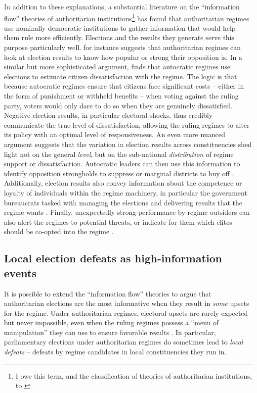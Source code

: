 \documentclass[12pt]{article}\usepackage[]{graphicx}\usepackage[]{color}
\newcommand{\1}{\mathbbm{1}}
\begin{document}
In addition to these explanations, a substantial literature on the ``information flow'' theories of authoritarian institutions\footnote{I owe this term, and the classification of theories of authoritarian institutions, to \cite{Hou2017}} has found that authoritarian regimes use nominally democratic institutions to gather information that would help them rule more efficiently. Elections and the results they generate serve this purpose particularly well. \cite{Geddes2005} for instance suggests that authoritarian regimes can look at election results to know how popular or strong their opposition is. In a similar but more sophisticated argument, \cite{Miller2015} finds that autocratic regimes use elections to estimate citizen dissatisfaction with the regime. The logic is that because autocratic regimes ensure that citizens face significant costs -- either in the form of punishment or withheld benefits -- when voting against the ruling party, voters would only dare to do so when they are genuinely dissatisfied. Negative election results, in particular electoral shocks, thus credibly communicate the true level of dissatisfaction, allowing the ruling regimes to alter its policy with an optimal level of responsiveness. An even more nuanced argument suggests that the variation in election results across constituencies shed light not on the general \textit{level}, but on the sub-national \textit{distribution} of regime support or dissatisfaction. Autocratic leaders can then use this information to identify opposition strongholds to suppress \citep{Magaloni2006, Blaydes2008} or marginal districts to buy off \citep{Reed2001, Magaloni2006}. Additionally, election results also convey information about the competence or loyalty of individuals within the regime machinery, in particular the government bureaucrats tasked with managing the elections and delivering results that the regime wants \citep{Magaloni2006, Blaydes2008}. Finally, unexpectedly strong performance by regime outsiders can also alert the regimes to potential threats, or indicate for them which elites should be co-opted into the regime \cite{LustOkar2005}.

\subsection{Local election defeats as high-information events}
It is possible to extend the ``information flow'' theories to argue that authoritarian elections are the most informative when they result in \textit{some} upsets for the regime. Under authoritarian regimes, electoral upsets are rarely expected but never impossible, even when the ruling regimes possess a ``menu of manipulation'' they can use to ensure favorable results \citep{Schedler2002Menu}. In particular, parliamentary elections under authoritarian regimes do sometimes lead to \textit{local defeats} -- defeats by regime candidates in local constituencies they run in. 
\end{document}
